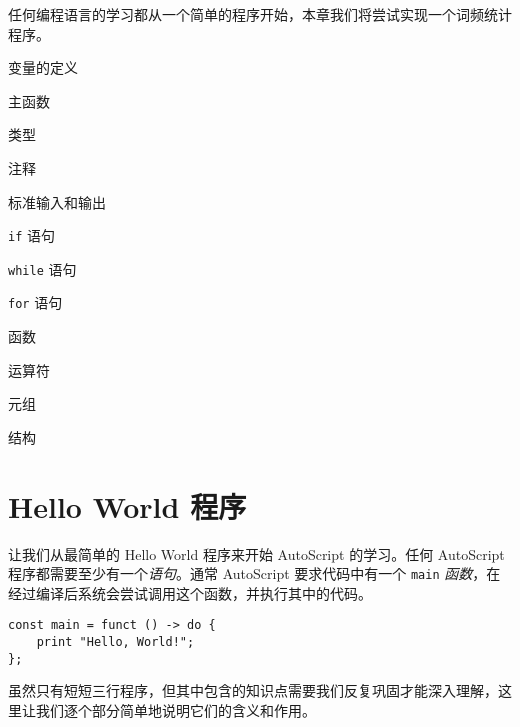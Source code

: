 任何编程语言的学习都从一个简单的程序开始，本章我们将尝试实现一个词频统计程序。

\begin{introduction}
    \item 变量的定义
    \item 主函数
    \item 类型
    \item 注释
    \item 标准输入和输出
    \item \lstinline!if! 语句
    \item \lstinline!while! 语句
    \item \lstinline!for! 语句
    \item 函数
    \item 运算符
    \item 元组
    \item 结构
\end{introduction}

\section{Hello World 程序}

让我们从最简单的 Hello World 程序来开始 AutoScript 的学习。任何 AutoScript 程序都需要至少有一个\emph{语句}。通常 AutoScript 要求代码中有一个 \lstinline!main! \emph{函数}，在经过编译后系统会尝试调用这个函数，并执行其中的代码。

\begin{lstlisting}
const main = funct () -> do {
    print "Hello, World!";
};
\end{lstlisting}

虽然只有短短三行程序，但其中包含的知识点需要我们反复巩固才能深入理解，这里让我们逐个部分简单地说明它们的含义和作用。

